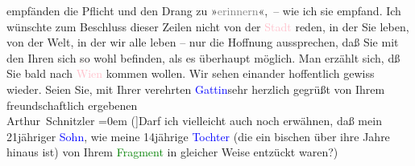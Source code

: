                     empfänden die Pflicht und den Drang zu »\textcolor{gray}{erinnern}«, – wie ich
                    sie empfand.\pend
           \pstart
           Ich wünschte zum Beschluss dieser Zeilen {\pb}nicht von der \textcolor{pink}{Stadt}{}
                    reden, in der Sie leben, von der Welt, in der wir alle leben – nur die Hoffnung
                    aussprechen, daß Sie mit den Ihren sich so wohl befinden, als es überhaupt
                    möglich. Man erzählt sich, dß Sie bald nach \textcolor{pink}{Wien}{}\ledrightnote{\textcolor{pink}{Wien}}
                    kommen wollen. Wir sehen einander hoffentlich gewiss wieder.\pend
           \pstart
           Seien Sie, mit Ihrer verehrten \textcolor{blue}{Gattin}{}sehr herzlich gegrüßt von Ihrem{\\[\baselineskip]}freundschaftlich ergebenen{\\[\baselineskip]}\spacefill\mbox{Arthur Schnitzler}\pend
           \leftskip=0em{}\pstart
           \noindent{}{[}({]}Darf ich vielleicht auch noch erwähnen, daß mein
                        21jähriger \textcolor{blue}{Sohn}{}, wie
                        meine 14jährige \textcolor{blue}{Tochter}{}
                        (die ein bischen über ihre Jahre hinaus ist) von Ihrem \textcolor{green}{Fragment}{} in gleicher Weise entzückt
                        waren?) \pend
           \endnumbering{}  
      